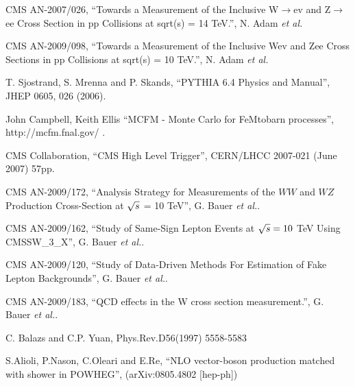 \documentclass{cmspaper}
\begin{document}
\pagebreak

\vspace*{-0.2cm}

 CMS AN-2007/026, ``Towards a Measurement of the Inclusive W$\rightarrow$ev and Z$\rightarrow$ee Cross Section in pp Collisions at sqrt(s) = 14 TeV.'', N. Adam \textit{et al.}

 CMS AN-2009/098, ``Towards a Measurement of the Inclusive Wev and Zee Cross Sections in pp Collisions at sqrt(s) = 10 TeV.'', N. Adam \textit{et al.}

 T. Sjostrand, S. Mrenna and P. Skands, ``PYTHIA 6.4 Physics and Manual'', JHEP 0605, 026 (2006).


 John Campbell, Keith Ellis ``MCFM - Monte Carlo for FeMtobarn processes'', http://mcfm.fnal.gov/ .


 
 CMS Collaboration, ``CMS High Level Trigger'', CERN/LHCC 2007-021 (June 2007) 57pp.

 CMS AN-2009/172, ``Analysis Strategy for Measurements of the $WW$ and $WZ$ Production Cross-Section at $\sqrt{s}$ = 10 TeV'',
G. Bauer \textit{et al.}.

 CMS AN-2009/162, ``Study of Same-Sign Lepton Events at $\sqrt{s} = 10$ TeV Using CMSSW\_3\_X'',
G. Bauer \textit{et al.}.

 CMS AN-2009/120, ``Study of Data-Driven Methods For Estimation of Fake Lepton Backgrounds'',
G. Bauer \textit{et al.}.

 CMS AN-2009/183, ``QCD effects in the W cross section measurement.'',
G. Bauer \textit{et al.}.

 C. Balazs and C.P. Yuan, Phys.Rev.D56(1997) 5558-5583

 S.Alioli, P.Nason, C.Oleari and E.Re, ``NLO vector-boson production matched with shower in POWHEG'', (arXiv:0805.4802 [hep-ph])
\end{document}
